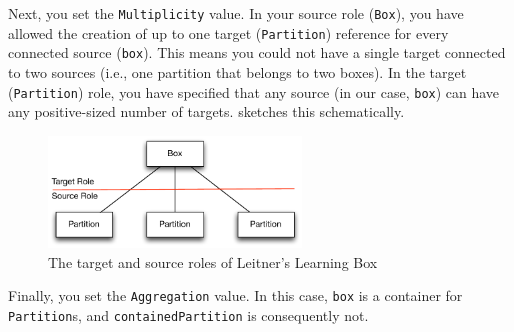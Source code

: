 Next, you set the \texttt{Multiplicity} value.  In your source role (\texttt{Box}), you have allowed the creation of up to one target (\texttt{Partition})
reference for every connected source (\texttt{box}). This means you could not have a single target connected to two sources (i.e., one partition that belongs to
two boxes). In the target (\texttt{Partition}) role, you have specified that any source (in our case, \texttt{box}) can have any positive-sized number of targets.
 sketches this schematically.

\vspace{0.5cm}

\begin{figure}[htbp]
	\centering
    \includegraphics[width=0.6\textwidth]{../../org.moflon.doc.handbook.02_leitnersLearningBox/2_staticSemantics/3_connectingClasses/ccVisImages/sketch_multiplicities.pdf}
	\caption{The target and source roles of Leitner's Learning Box}
	\label{fig:sketch_roles}
\end{figure}
\FloatBarrier

Finally, you set the \texttt{Aggregation} value. In this case, \texttt{box} is a container for \texttt{Partition}s, and \texttt{containedPartition} is
consequently not.


